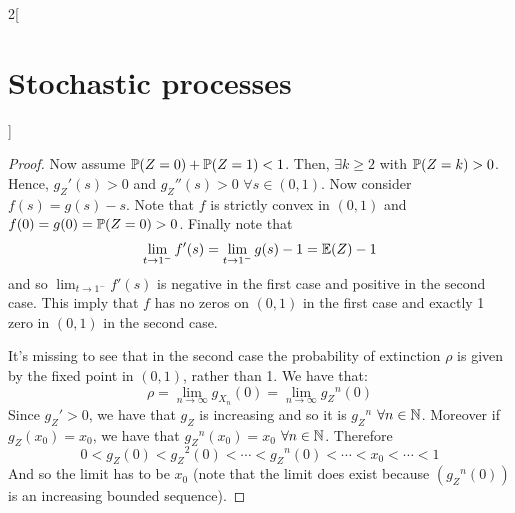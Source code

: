 \documentclass[../../../main_math.tex]{subfiles}
\begin{document}
\begin{multicols}{2}[\section{Stochastic processes}]
\begin{proof}
    Now assume $\mathbb{P}(Z=0)+\mathbb{P}(Z=1)<1$. Then, $\exists k\geq 2$ with $\mathbb{P}(Z=k)>0$. Hence, ${g_Z}'(s)>0$ and ${g_Z}''(s)>0$ $\forall s\in (0,1)$. Now consider $f(s)=g(s)-s$. Note that $f$ is strictly convex in $(0,1)$ and $f(0)=g(0)=\mathbb{P}(Z=0)>0$. Finally note that $$\lim_{t\to 1^-} f'(s)=\lim_{t\to 1^-}g(s)-1=\mathbb{E}(Z)-1$$
    and so $\displaystyle\lim_{t\to 1^-} f'(s)$ is negative in the first case and positive in the second case. This imply that $f$ has no zeros on $(0,1)$ in the first case and exactly 1 zero in $(0,1)$ in the second case.

    It's missing to see that in the second case the probability of extinction $\rho$ is given by the fixed point in $(0,1)$, rather than 1. We have that:
    $$\rho=\lim_{n\to\infty}g_{X_n}(0)=\lim_{n\to\infty}{g_Z}^n(0)$$
    Since ${g_Z}'>0$, we have that ${g_Z}$ is increasing and so it is ${g_Z}^n$ $\forall n\in\mathbb{N}$. Moreover if ${g_Z}(x_0)=x_0$, we have that ${g_Z}^n(x_0)=x_0$ $\forall n\in\mathbb{N}$. Therefore $$0<{g_Z}(0)<{g_Z}^2(0)<\cdots<{g_Z}^n(0)<\cdots <x_0<\cdots <1$$
    And so the limit has to be $x_0$ (note that the limit does exist because $({g_Z}^n(0))$ is an increasing bounded sequence).
  \end{proof}

\end{multicols}
\end{document}
